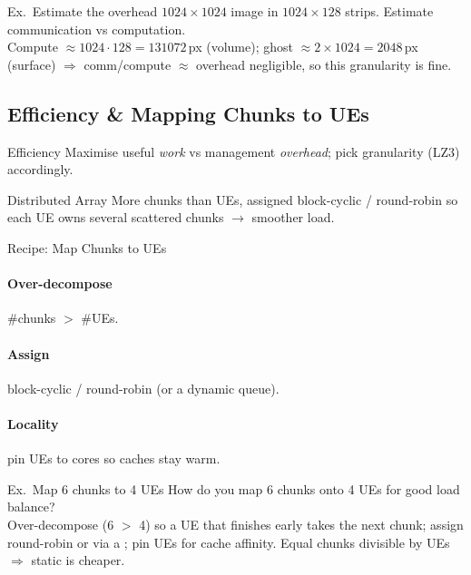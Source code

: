 \begin{example2}{Ex.\ Estimate the overhead}
    $1024\times1024$ image in $1024\times128$ strips. Estimate communication vs computation.
     \\ 
    Compute $\approx 1024\cdot128 = 131072$\,px (volume); ghost $\approx 2\times1024 = 2048$\,px (surface) $\Rightarrow$ comm/compute $\approx$  overhead negligible, so this granularity is fine.
\end{example2}

\multend

\subsection{Efficiency \& Mapping Chunks to UEs}


\begin{concept}{Efficiency}
    Maximise useful \emph{work} vs management \emph{overhead}; pick granularity (LZ3) accordingly.
\end{concept}

\begin{concept}{Distributed Array}
    More chunks than UEs, assigned block-cyclic / round-robin so each UE owns several scattered chunks $\to$ smoother load.
\end{concept}

\multend


\begin{KR}{Recipe: Map Chunks to UEs}
    \paragraph{Over-decompose} \#chunks $>$ \#UEs.
    \paragraph{Assign} block-cyclic / round-robin (or a dynamic queue).
    \paragraph{Locality} pin UEs to cores so caches stay warm.
\end{KR}

\begin{example2}{Ex.\ Map 6 chunks to 4 UEs}
    How do you map 6 chunks onto 4 UEs for good load balance?
     \\ 
    Over-decompose (6 $>$ 4) so a UE that finishes early takes the next chunk; assign round-robin or via a ; pin UEs for cache affinity. Equal chunks divisible by UEs $\Rightarrow$ static is cheaper.
\end{example2}

